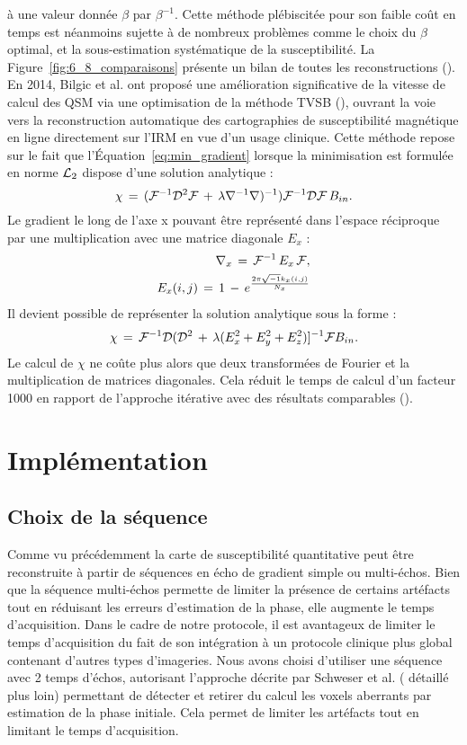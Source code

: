 {à une valeur donnée $\beta$ par $\beta^{-1}$. Cette méthode plébiscitée pour son faible coût en temps est néanmoins
sujette à de nombreux problèmes comme le choix du $\beta$ optimal, et la sous-estimation systématique de
la susceptibilité. La Figure~\ref{fig:6_8_comparaisons} présente un bilan de toutes les reconstructions (\cite{Wang_Liu_2014}).\\
En 2014, Bilgic et al. ont proposé une amélioration significative de la vitesse de calcul des QSM
via une optimisation de la méthode TVSB (\cite{Bilgic2013}), ouvrant la voie vers la reconstruction automatique des
cartographies de susceptibilité magnétique en ligne directement sur l’IRM en vue d’un usage clinique.
Cette méthode repose sur le fait que l’Équation~\ref{eq:min_gradient} lorsque la minimisation est formulée en norme ${\cal L}_2$
dispose d’une solution analytique :
\begin{equation}
\label{eq:bilgicanal}
\chi\,= \,({\cal F}^{-1}{\cal D}^{2}{\cal F}\,+\,\lambda\nabla^{-1}\nabla)^{-1}){\cal F}^{-1}{\cal D}{\cal F}\,B_{in}.
\end{equation}
Le gradient le long de l’axe x pouvant être représenté dans l’espace réciproque par une multiplication
avec une matrice diagonale $E_x$ :
\begin{eqnarray}
\nabla_x\,=\,{\cal F}^{-1}\,E_x\,{\cal F},\\
E_x(i,j)\,=\,1\,-\,e^{\frac{2\pi\sqrt{-1}k_x(i,j)}{N_x}}
\end{eqnarray}
Il devient possible de représenter la solution analytique sous la forme :
\begin{equation}
\chi\,=\,{\cal F}^{-1}{\cal D}({\cal D}^2\,+\,\lambda(E_x^2+E_y^2+E_z^2)]^{-1}{\cal F}B_{in}.
\end{equation}
Le calcul de $\chi$ ne coûte plus alors que deux transformées de Fourier et la multiplication de matrices
diagonales. Cela réduit le temps de calcul d’un facteur 1000 en rapport de l’approche itérative avec
des résultats comparables (\cite{Bilgic2013}).
\section{Implémentation}
\subsection{Choix de la séquence}
Comme vu précédemment la carte de susceptibilité quantitative peut être reconstruite à partir
de séquences en écho de gradient simple ou multi-échos. Bien que la séquence multi-échos permette
de limiter la présence de certains artéfacts tout en réduisant les erreurs d’estimation de la phase, elle
augmente le temps d’acquisition. Dans le cadre de notre protocole, il est avantageux de limiter le
temps d’acquisition du fait de son intégration à un protocole clinique plus global contenant d’autres
types d’imageries. Nous avons choisi d’utiliser une séquence avec 2 temps d’échos, autorisant
l’approche décrite par Schweser et al. (\cite{Schweser2011} détaillé plus loin) permettant de détecter et retirer du
calcul les voxels aberrants par estimation de la phase initiale. Cela permet de limiter les artéfacts tout
en limitant le temps d’acquisition.\\
}
